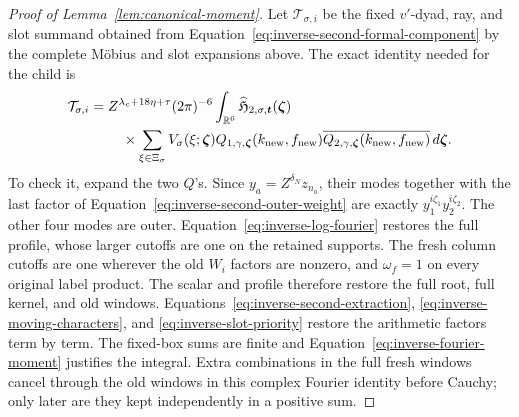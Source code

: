 \documentclass[11pt,a4paper]{article}
\numberwithin{equation}{section}
\numberwithin{figure}{section}
\theoremstyle{definition}
\theoremstyle{remark}
\begin{document}
\begin{proof}[Proof of Lemma~\ref{lem:canonical-moment}]
Let \(\mathcal T_{\sigma,i}\) be the fixed \(v'\)-dyad, ray, and slot
summand obtained from Equation~\eqref{eq:inverse-second-formal-component}
by the complete M\"obius and slot expansions above.  The exact identity
needed for the child is
\begin{equation}\label{eq:inverse-xi-identity}
 \begin{split}
 \mathcal T_{\sigma,i}={}&Z^{\lambda_c+18\eta+\tau}(2\pi)^{-6}
 \int_{\mathbb R^6}\widehat{\mathfrak H}_{2,\sigma,\boldsymbol t}
       (\boldsymbol\zeta)\\
 &\quad\times\sum_{\xi\in\Xi_\sigma}V_\sigma(\xi;\boldsymbol\zeta)
 Q_{1,\gamma,\boldsymbol\zeta}(k_{\rm new},f_{\rm new})
 \overline{Q_{2,\gamma,\boldsymbol\zeta}(k_{\rm new},f_{\rm new})}
 \,d\boldsymbol\zeta.
 \end{split}
\end{equation}
To check it, expand the two \(Q\)'s.  Since
\(y_a=Z^{\delta_N}z_{n_a}\), their modes together with the last
factor of Equation~\eqref{eq:inverse-second-outer-weight} are exactly
\(y_1^{i\zeta_1}y_2^{i\zeta_2}\).  The other four modes are outer.
Equation~\eqref{eq:inverse-log-fourier} restores the full profile,
whose larger cutoffs are one on the retained supports.  The fresh
column cutoffs are one wherever the old \(W_i\) factors are nonzero,
and \(\omega_f=1\) on every original label product.  The scalar and
profile therefore restore the full root, full kernel, and old windows.
Equations~\eqref{eq:inverse-second-extraction},
\eqref{eq:inverse-moving-characters}, and
\eqref{eq:inverse-slot-priority} restore the arithmetic factors term
by term.  The fixed-box sums are finite and
Equation~\eqref{eq:inverse-fourier-moment} justifies the integral.
Extra combinations in the full fresh windows cancel through the old
windows in this complex Fourier identity before Cauchy; only later are
they kept independently in a positive sum.


\end{proof}
\end{document}

